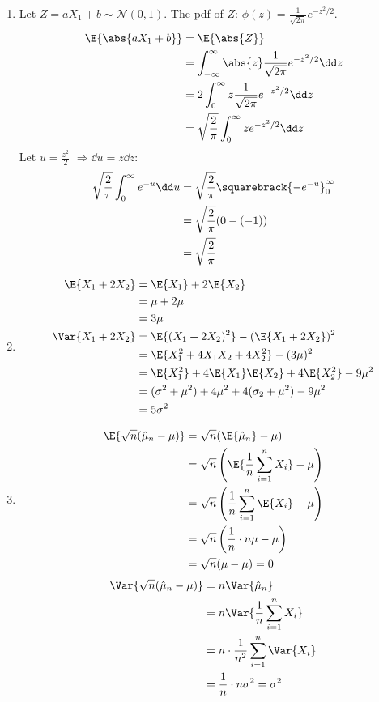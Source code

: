 \documentclass[fleqn]{article}
\begin{document}
\begin{enumerate}[label=(\alph*)]
\item
Let $Z = aX_1 + b \sim \mathcal{N}(0, 1)$. The pdf of $Z$: $\phi(z) = \frac{1}{\sqrt{2\pi}} e^{-z^2/2}$.
\begin{align*}
\E{\abs{aX_1 + b}} &= \E{\abs{Z}} \\
                   &= \int_{-\infty}^{\infty} \abs{z} \frac{1}{\sqrt{2\pi}} e^{-z^2/2} \dd z \\
                   &= 2 \int_{0}^{\infty} z \frac{1}{\sqrt{2\pi}} e^{-z^2/2} \dd z \\
                   &= \sqrt{\frac{2}{\pi}} \int_{0}^{\infty} z e^{-z^2/2} \dd z
\end{align*}
Let $u = \frac{z^2}{2}$ $\Rightarrow \dd u = z \dd z$:
\begin{align*}
\sqrt{\frac{2}{\pi}} \int_{0}^{\infty} e^{-u} \dd u &= \sqrt{\frac{2}{\pi}} \squarebrack{-e^{-u}}_0^\infty \\
                                                    &= \sqrt{\frac{2}{\pi}} (0 - (-1)) \\
                                                    &= \sqrt{\frac{2}{\pi}}
\end{align*}
\item
\begin{align*}
\E{X_1 + 2X_2} &= \E{X_1} + 2\E{X_2} \\
               &= \mu + 2\mu \\
               &= 3\mu \\
\Var{X_1+2X_2} &= \E{(X_1+2X_2)^2} - (\E{X_1 + 2X_2})^2 \\
               &= \E{X_1^2 + 4X_1X_2 + 4X_2^2} - (3\mu)^2 \\
               &= \E{X_1^2} + 4\E{X_1}\E{X_2} + 4\E{X_2^2} - 9\mu^2 \\
               &= (\sigma^2 + \mu^2) + 4\mu^2 +4(\sigma_2 + \mu^2) - 9\mu^2 \\
               &= 5\sigma^2
\end{align*}

\item
\begin{align*}
\E{\sqrt{n}(\hat{\mu}_n - \mu)} &= \sqrt{n}(\E{\hat{\mu}_n} - \mu) \\
    &= \sqrt{n}\left(\E{\frac{1}{n}\sum_{i=1}^{n}X_i} - \mu\right) \\
    &= \sqrt{n}\left(\frac{1}{n}\sum_{i=1}^{n}\E{X_i} - \mu\right) \\
    &= \sqrt{n}\left(\frac{1}{n} \cdot n\mu - \mu\right) \\
    &= \sqrt{n}(\mu - \mu) = 0
\end{align*}
\begin{align*}
\Var{\sqrt{n}(\hat{\mu}_n - \mu)} &= n \Var{\hat{\mu}_n} \\
    &= n \Var{\frac{1}{n}\sum_{i=1}^{n}X_i} \\
    &= n \cdot \frac{1}{n^2}\sum_{i=1}^{n}\Var{X_i} \\
    &= \frac{1}{n} \cdot n\sigma^2 = \sigma^2
\end{align*}
\end{enumerate}
\end{document}
